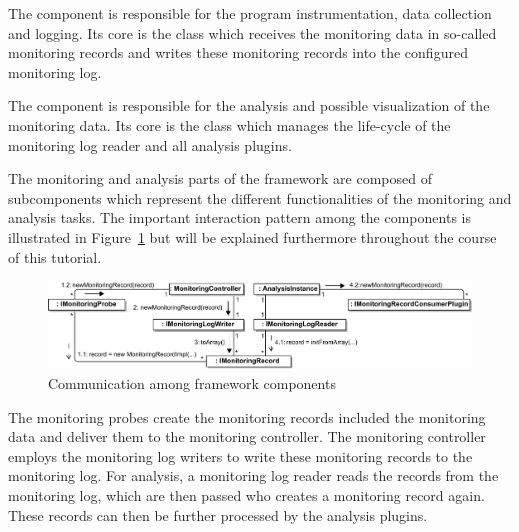 \noindent The \KiekerMonitoringPart{} component is responsible for the program instrumentation, data collection and logging. Its core is the class  which receives the monitoring data in so-called monitoring records and writes these monitoring records into the configured monitoring log. 

The component \KiekerAnalysisPart{} is responsible for the analysis and possible visualization of the monitoring data. Its core is the class  which manages the life-cycle of the monitoring log reader and all analysis plugins.

The monitoring and analysis parts of the \Kieker{} framework are composed of subcomponents which represent the different functionalities of the monitoring and analysis tasks. The important interaction pattern among the components is illustrated in Figure~\ref{fig:KiekerCommunicationDiagram} but will be explained furthermore throughout the course of this tutorial. 

\begin{figure}[H]\centering
\includegraphics[width=1\textwidth]{images/kiekerCommunications-revisedReArranged-woMonitoringLog-bw-newNames}
\caption{Communication among \Kieker{} framework components}
\label{fig:KiekerCommunicationDiagram}
\end{figure}
		
\noindent The monitoring probes create the monitoring records included the %
monitoring data and deliver them to the monitoring controller. %
The monitoring controller employs the monitoring log writers to write these %
monitoring records to the monitoring log. %
For analysis, a monitoring log reader reads the records from the monitoring log, 
which are then passed  who creates a monitoring record again. These records can %
then be further processed by the analysis plugins.


